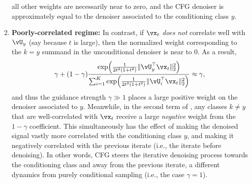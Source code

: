 \documentclass[../../book-main.tex]{subfiles}
\begin{document}
\begin{example}
\begin{enumerate}
      all other weights are necessarily near to zero, and the CFG denoiser
      is approximately equal to the denoiser associated to the conditioning
      class $y$.
    \item \textbf{Poorly-correlated regime:} In contrast, if $\vx_t$
      \textit{does not} correlate well with $\vU_y$ (say because $t$ is large),
      then the normalized weight corresponding to the $k=y$ summand in the
      unconditional denoiser is near to $0$. As a result, 
      \begin{equation}
        \gamma + (1 - \gamma) 
      \frac{\exp\rp{\frac{1}{2t^{2}(1
      + t^{2})}\norm{\vU_{y}^{\top}\vx_t}_{2}^{2}}}{\sum_{i
      = 1}^{K}\exp\rp{\frac{1}{2t^{2}(1
      + t^{2})}\norm{\vU_{i}^{\top}\vx_t}_{2}^{2}}}
        \approx \gamma,
      \end{equation}
      and thus the guidance strength $\gamma \gg 1$ places a large positive
      weight on the denoiser associated to $y$.
      Meanwhile, in the second term of ,
      any classes $k \neq y$ that are well-correlated with $\vx_t$ 
      receive a large \textit{negative} weight from the $1 - \gamma$
      coefficient.
      This simultaneously has the effect of making the denoised signal vastly
      more correlated with the conditioning class $y$, and making it negatively
      correlated with the previous iterate (i.e., the iterate before denoising).
      In other words, CFG steers the iterative denoising process towards the
      conditioning class and away from the previous iterate, a different
      dynamics from purely conditional sampling (i.e., the case $\gamma = 1$).
  \end{enumerate}


\end{example}
\end{document}
